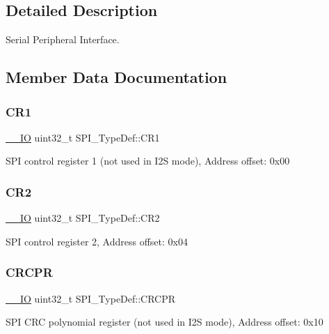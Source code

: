 \subsection{Detailed Description}
Serial Peripheral Interface. 

\subsection{Member Data Documentation}
\mbox{\label{struct_s_p_i___type_def_a6ecd5cb63b85c381bd67dc90dd4f573a}} 
\subsubsection{\texorpdfstring{CR1}{CR1}}
{\footnotesize\ttfamily \mbox{\hyperlink{core__sc300_8h_aec43007d9998a0a0e01faede4133d6be}{\+\_\+\+\_\+\+IO}} uint32\+\_\+t S\+P\+I\+\_\+\+Type\+Def\+::\+C\+R1}

S\+PI control register 1 (not used in I2S mode), Address offset\+: 0x00 \mbox{\label{struct_s_p_i___type_def_a38cb89a872e456e6ecd29b6c71d85600}} 
\subsubsection{\texorpdfstring{CR2}{CR2}}
{\footnotesize\ttfamily \mbox{\hyperlink{core__sc300_8h_aec43007d9998a0a0e01faede4133d6be}{\+\_\+\+\_\+\+IO}} uint32\+\_\+t S\+P\+I\+\_\+\+Type\+Def\+::\+C\+R2}

S\+PI control register 2, Address offset\+: 0x04 \mbox{\label{struct_s_p_i___type_def_a609d2a279b1927846a991deb9d0dc0b0}} 
\subsubsection{\texorpdfstring{CRCPR}{CRCPR}}
{\footnotesize\ttfamily \mbox{\hyperlink{core__sc300_8h_aec43007d9998a0a0e01faede4133d6be}{\+\_\+\+\_\+\+IO}} uint32\+\_\+t S\+P\+I\+\_\+\+Type\+Def\+::\+C\+R\+C\+PR}

S\+PI C\+RC polynomial register (not used in I2S mode), Address offset\+: 0x10 \mbox{\label{struct_s_p_i___type_def_a02ef206dd5bb270e1f17fedd71284422}} 
